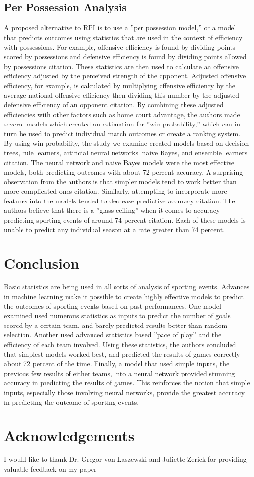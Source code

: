 \documentclass[sigconf]{acmart}
\begin{document}
\subsection{Per Possession Analysis}
A proposed alternative to RPI is to use a ''per possession model,'' or a model that predicts outcomes using statistics that are used in the context of efficiency with possessions. For example, offensive efficiency is found by dividing points scored by possessions and defensive efficiency is found by dividing points allowed by possessions citation\cite{PerPossession}. These statistics are then used to calculate an offensive efficiency adjusted by the perceived strength of the opponent. Adjusted offensive efficiency, for example, is calculated by multiplying offensive efficiency by the average national offensive efficiency then dividing this number by the adjusted defensive efficiency of an opponent citation. By combining these adjusted efficiencies with other factors such as home court advantage, the authors made several models which created an estimation for ''win probability,'' which can in turn be used to predict individual match outcomes or create a ranking system. By using win probability, the study we examine created models based on decision trees, rule learners, artificial neural networks, naive Bayes, and ensemble learners citation. The neural network and naive Bayes models were the most effective models, both predicting outcomes with about 72 percent accuracy. A surprising observation from the authors is that simpler models tend to work better than more complicated ones citation. Similarly, attempting to incorporate more features into the models tended to decrease predictive accuracy citation. The authors believe that there is a ''glass ceiling'' when it comes to accuracy predicting sporting events of around 74 percent citation. Each of these models is unable to predict any individual season at a rate greater than 74 percent.\cite{PerPossession}


\section{Conclusion}
Basic statistics are being used in all sorts of analysis of sporting events. Advances in machine learning make it possible to create highly effective models to predict the outcomes of sporting events based on past performances. One model examined used numerous statistics as inputs to predict the number of goals scored by a certain team, and barely predicted results better than random selection. Another used advanced statistics based ''pace of play'' and the efficiency of each team involved. Using these statistics, the authors concluded that simplest models worked best, and predicted the results of games correctly about 72 percent of the time. Finally, a model that used simple inputs, the previous few results of either teams, into a neural network provided stunning accuracy in predicting the results of games. This reinforces the notion that simple inputs, especially those involving neural networks, provide the greatest accuracy in predicting the outcome of sporting events.

\section{Acknowledgements}
I would like to thank Dr. Gregor von Laszewski and Juliette Zerick for providing valuable feedback on my paper



\end{document}
